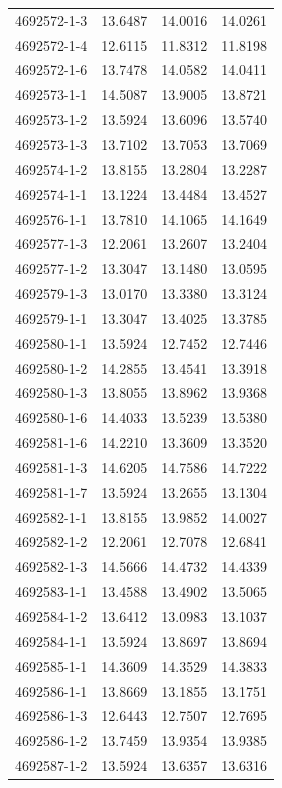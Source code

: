 \begin{longtable}{lrrr}
4692572-1-3 & 13.6487 & 14.0016 & 14.0261 \\
4692572-1-4 & 12.6115 & 11.8312 & 11.8198 \\
4692572-1-6 & 13.7478 & 14.0582 & 14.0411 \\
4692573-1-1 & 14.5087 & 13.9005 & 13.8721 \\
4692573-1-2 & 13.5924 & 13.6096 & 13.5740 \\
4692573-1-3 & 13.7102 & 13.7053 & 13.7069 \\
4692574-1-2 & 13.8155 & 13.2804 & 13.2287 \\
4692574-1-1 & 13.1224 & 13.4484 & 13.4527 \\
4692576-1-1 & 13.7810 & 14.1065 & 14.1649 \\
4692577-1-3 & 12.2061 & 13.2607 & 13.2404 \\
4692577-1-2 & 13.3047 & 13.1480 & 13.0595 \\
4692579-1-3 & 13.0170 & 13.3380 & 13.3124 \\
4692579-1-1 & 13.3047 & 13.4025 & 13.3785 \\
4692580-1-1 & 13.5924 & 12.7452 & 12.7446 \\
4692580-1-2 & 14.2855 & 13.4541 & 13.3918 \\
4692580-1-3 & 13.8055 & 13.8962 & 13.9368 \\
4692580-1-6 & 14.4033 & 13.5239 & 13.5380 \\
4692581-1-6 & 14.2210 & 13.3609 & 13.3520 \\
4692581-1-3 & 14.6205 & 14.7586 & 14.7222 \\
4692581-1-7 & 13.5924 & 13.2655 & 13.1304 \\
4692582-1-1 & 13.8155 & 13.9852 & 14.0027 \\
4692582-1-2 & 12.2061 & 12.7078 & 12.6841 \\
4692582-1-3 & 14.5666 & 14.4732 & 14.4339 \\
4692583-1-1 & 13.4588 & 13.4902 & 13.5065 \\
4692584-1-2 & 13.6412 & 13.0983 & 13.1037 \\
4692584-1-1 & 13.5924 & 13.8697 & 13.8694 \\
4692585-1-1 & 14.3609 & 14.3529 & 14.3833 \\
4692586-1-1 & 13.8669 & 13.1855 & 13.1751 \\
4692586-1-3 & 12.6443 & 12.7507 & 12.7695 \\
4692586-1-2 & 13.7459 & 13.9354 & 13.9385 \\
4692587-1-2 & 13.5924 & 13.6357 & 13.6316 \\

\end{longtable}
